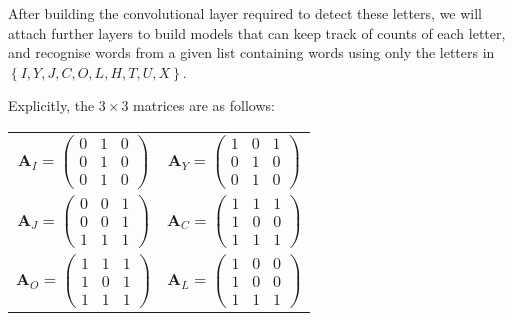 \documentclass{somasmsc}
\begin{document}
After building the convolutional layer required to detect these letters, we will attach further layers to build models that can keep track of counts of each letter, and recognise words from a given list containing words using only the letters in $\left\{I, Y, J, C, O, L, H, T, U, X\right\}$.

Explicitly, the $3 \times 3$ matrices are as follows:
\begin{center}
\begin{tabular}{c c}
    $\mathbf{A}_I =
    \begin{pmatrix}
        0 & 1 & 0 \\
        0 & 1 & 0 \\
        0 & 1 & 0
    \end{pmatrix}$ &
    $\mathbf{A}_Y =
    \begin{pmatrix}
        1 & 0 & 1 \\
        0 & 1 & 0 \\
        0 & 1 & 0
    \end{pmatrix}$ \\
    $\mathbf{A}_J =
    \begin{pmatrix}
        0 & 0 & 1 \\
        0 & 0 & 1 \\
        1 & 1 & 1
    \end{pmatrix}$ &
    $\mathbf{A}_C =
    \begin{pmatrix}
        1 & 1 & 1 \\
        1 & 0 & 0 \\
        1 & 1 & 1
    \end{pmatrix}$ \\
    $\mathbf{A}_O =
    \begin{pmatrix}
        1 & 1 & 1 \\
        1 & 0 & 1 \\
        1 & 1 & 1
    \end{pmatrix}$ &
    $\mathbf{A}_L =
    \begin{pmatrix}
        1 & 0 & 0 \\
        1 & 0 & 0 \\
        1 & 1 & 1
    \end{pmatrix}$
\end{tabular}
\end{center}
\end{document}
